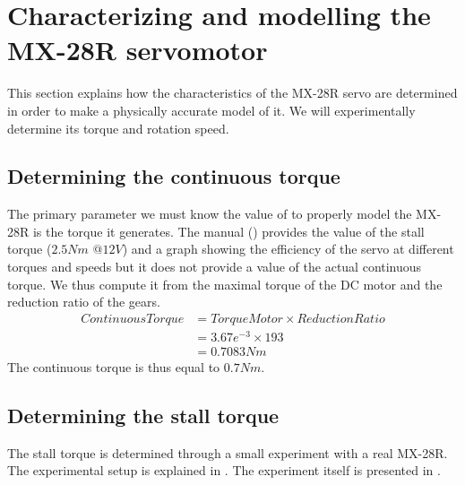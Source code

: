 \clearpage
\section{Characterizing and modelling the MX-28R servomotor}
This section explains how the characteristics of the MX-28R servo are determined in order to make a physically accurate model of it. We will experimentally determine its torque and rotation speed.

\subsection{Determining the continuous torque}
The primary parameter we must know the value of to properly model the MX-28R is the torque it generates. The manual (\cite{mx_28_manual}) provides the value of the stall torque ($2.5Nm$ @$12V$) and a graph showing the efficiency of the servo at different torques and speeds but it does not provide a value of the actual continuous torque. We thus compute it from the maximal torque of the DC motor and the reduction ratio of the gears. 
\begin{align*}
ContinuousTorque &= TorqueMotor \times ReductionRatio\\
&= 3.67e^{-3} \times 193\\
&= 0.7083Nm
\end{align*}
The continuous torque is thus equal to $0.7Nm$.

\subsection{Determining the stall torque}
The stall torque is determined through a small experiment with a real MX-28R. The experimental setup is explained in . The experiment itself is presented in .

